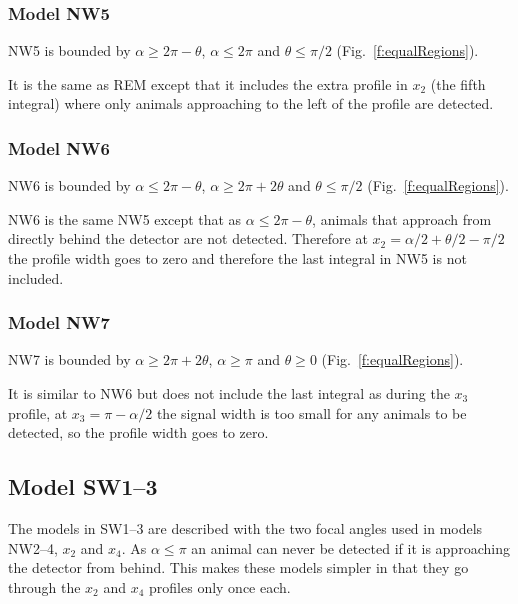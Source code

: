 \subsubsection{Model NW5} \label{NW5}

NW5 is bounded by $\alpha \ge 2\pi - \theta$, $\alpha \le 2\pi$ and $\theta \le \pi/2$ (Fig.~\ref{f:equalRegions}).

It is the same as REM except that it includes the extra profile in $x_2$ (the fifth integral) where only animals approaching to the left of the profile are detected.



\subsubsection{Model NW6} \label{NW6}

NW6 is bounded by $\alpha \le 2\pi - \theta$, $\alpha \ge 2\pi + 2\theta$ and $\theta \le \pi/2$ (Fig.~\ref{f:equalRegions}).

NW6 is the same NW5 except that as $\alpha \le 2\pi - \theta$, animals that approach from directly behind the detector are not detected. Therefore at $x_2 = \alpha/2 + \theta/2 - \pi/2$ the profile width goes to zero and therefore the last integral in NW5 is not included.





\subsubsection{Model NW7} \label{NW7}

NW7 is bounded by $\alpha \ge 2\pi + 2\theta$, $\alpha \ge \pi$ and $\theta \ge 0$ (Fig.~\ref{f:equalRegions}).

It is similar to NW6 but does not include the last integral as during the $x_3$ profile, at $x_3 = \pi - \alpha/2$ the signal width is too small for any animals to be detected, so the profile width goes to zero.







\subsection{Model SW1--3} \label{SW13}
 
The models in SW1--3 are described with the two focal angles used in models NW2--4, $x_2$ and $x_4$. As $\alpha \le\pi$ an animal can never be detected if it is approaching the detector from behind. This makes these models simpler in that they go through the $x_2$ and $x_4$ profiles only once each. 

